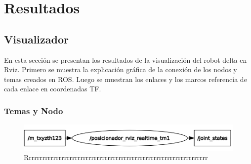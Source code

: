 \chapter{Resultados}\label{CAP7}

\section{Visualizador}
        En esta sección se presentan los resultados de la visualización del robot delta en Rviz. Primero se muestra la explicación gráfica de la conexión de los nodos y temas creados en ROS. Luego se muestran los enlaces y los marcos referencia de cada enlace en coordenadas TF. 

    \subsection{Temas y Nodo}
    
    \begin{figure}[h]
            \centering
            \includegraphics[width=1.0\linewidth]{Main/Chapter7/Images7/nodo_1.png}
            \caption{Rrrrrrrrrrrrrrrrrrrrrrrrrrrrrrrrrrrrrrrrrrrrrrrrrrrrrrrrrrrrrrrrrrr}
            \label{f:cap7_rviz1111}
        \end{figure} 
        
